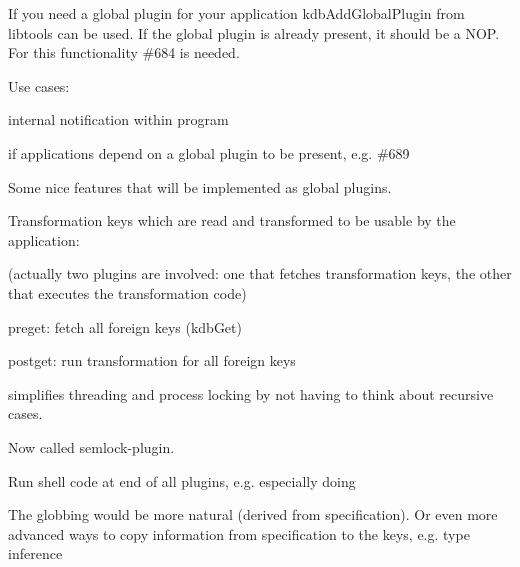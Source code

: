 \begin{DoxyCode}{0}
\end{DoxyCode}


If you need a global plugin for your application {\ttfamily kdb\+Add\+Global\+Plugin} from libtools can be used. If the global plugin is already present, it should be a N\+OP. For this functionality \#684 is needed.

Use cases\+:


\begin{DoxyItemize}
\item internal notification within program
\item if applications depend on a global plugin to be present, e.\+g. \#689
\end{DoxyItemize}

Some nice features that will be implemented as global plugins.

Transformation keys which are read and transformed to be usable by the application\+:


\begin{DoxyCode}{0}
\DoxyCodeLine{[dir/a]}
\end{DoxyCode}


(actually two plugins are involved\+: one that fetches transformation keys, the other that executes the transformation code)


\begin{DoxyItemize}
\item preget\+: fetch all foreign keys (kdb\+Get)
\item postget\+: run transformation for all foreign keys
\end{DoxyItemize}

simplifies threading and process locking by not having to think about recursive cases.

Now called {\ttfamily semlock}-\/plugin.

Run shell code at end of all plugins, e.\+g. especially doing


\begin{DoxyCode}{0}
\end{DoxyCode}


The globbing would be more natural (derived from specification). Or even more advanced ways to copy information from specification to the keys, e.\+g. type inference

